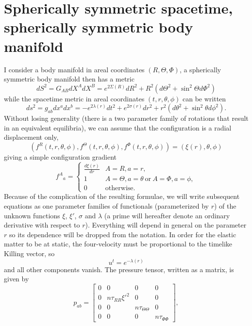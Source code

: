 \section{Spherically symmetric spacetime, spherically symmetric body
manifold}

I consider a body manifold in areal coordinates $(R,\Theta,\Phi)$, a
spherically symmetric body manifold then has a metric
\begin{equation}
dS^2 = G_{AB}dX^AdX^B = e^{2\Sigma(R)}dR^2 + R^2(d\Theta^2 +
\sin^2\Theta d\Phi^2)
\end{equation}
while the spacetime metric in areal coordinates $(t,r,\theta,\phi)$  can be written
\begin{equation}
ds^2 = g_{ab}dx^adx^b = -e^{2\lambda(r)}dt^2 + e^{2\sigma(r)}dr^2 + r^2(d\theta^2 +
\sin^2\theta d\phi^2).
\end{equation}
Without losing generality (there is a two parameter family of rotations that result in an equivalent equilibria), we can assume that the configuration is a
radial displacement only,
\begin{equation}
(f^R(t,r,\theta,\phi), f^\Theta(t,r,\theta,\phi),
f^\Phi(t,r,\theta,\phi)) = (\xi(r), \theta, \phi)
\end{equation}
giving a simple configuration gradient
\begin{equation}
f^A{}_a = \left\{
\begin{array}{lr}
\frac{d\xi(r)}{dr} & A=R,a=r, \\
1 & A=\Theta,a=\theta\ \mathrm{ or }\ A=\Phi,a=\phi, \\
0 & \mathrm{otherwise}.
\end{array}
\right.
\end{equation}
Because of the complication of the resulting formulae, we will write
subsequent equations as one parameter families of functionals 
(parameterized by $r$) of the unknown functions $\xi$,
$\xi'$, $\sigma$ and $\lambda$ (a prime will hereafter denote an
ordinary derivative with respect to $r$). Everything will depend in
general on the parameter $r$ so its dependence will be dropped from the
notation. In order for the elastic matter
to be at static, the four-velocity must be proportional to
the timelike Killing vector, so
\begin{equation}
u^t = e^{-\lambda(r)}
\end{equation}
and all other components vanish. The pressure tensor, written as a
matrix, is given by
\begin{equation}
p_{ab} = \left[
  \begin{array}{cccc}
    0 & 0 & 0 & 0 \\
    0 & n\tau_{RR}\xi'^2 & 0 & 0 \\
    0 & 0 & n\tau_{\Theta\Theta} & 0 \\
    0 & 0 & 0 & n\tau_{\Phi\Phi} 
  \end{array}
\right],
\end{equation}
